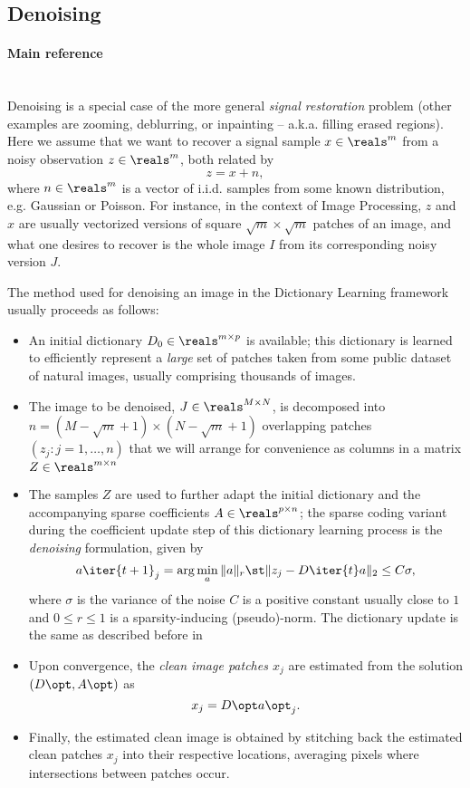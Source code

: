 \documentclass[a4paper]{IEEEtran}
\begin{document}
\subsection{Denoising}

\paragraph{Main reference} \cite{ksvd}\\

Denoising is a special case of the more general \emph{signal restoration} problem (other examples are zooming, deblurring, or inpainting -- a.k.a. filling erased regions). Here we assume that we want to recover a signal sample $x \in \reals^{m}$ from a noisy observation $z \in \reals^{m}$, both related by
\[
z = x + n,
\]
where $n \in \reals^m$ is a vector of i.i.d. samples from some known distribution, e.g. Gaussian or Poisson. For instance, in the context of Image Processing, $z$ and $x$ are usually vectorized versions of square $\sqrt{m}\times\sqrt{m}$ patches of an image, and what one desires to recover is the whole image $I$ from its corresponding noisy version $J$.

The method used for denoising an image in the Dictionary Learning framework usually proceeds as follows:
\begin{itemize}
\item An initial dictionary $D_0 \in \reals^{m{\times}p}$ is available; this dictionary is learned to efficiently represent a \emph{large} set of patches taken from some public dataset of natural images, usually comprising thousands of images.
\item The image to be denoised, $J \in \reals^{M{\times}N}$, is decomposed into $n=(M-\sqrt{m}+1){\times}(N-\sqrt{m}+1)$ overlapping patches $(z_j : j = 1,\ldots,n)$ that we will arrange for convenience as columns in a matrix $Z \in \reals^{m{\times}n}$
\item The samples $Z$ are used to further adapt the initial dictionary and the accompanying sparse coefficients $A \in \reals^{p{\times}n}$; the sparse coding variant during the coefficient update step of this dictionary learning process is the \emph{denoising} formulation, given by
\[
a\iter{t+1}_j = \arg\min_a \|a\|_r \st \|z_j - D\iter{t}a \|_2 \leq C\sigma, 
\]
where $\sigma$ is the variance of the noise $C$ is a positive constant usually close to $1$ and $0 \leq r \leq 1$ is a sparsity-inducing (pseudo)-norm. The dictionary update is the same as described before in 
\item Upon convergence, the \emph{clean image patches $x_j$} are estimated from the solution $(D\opt,A\opt)$ as $$x_j = D\opt a\opt_j.$$
\item Finally, the estimated clean image is obtained by stitching back the estimated clean patches $x_j$ into their respective locations, averaging pixels where intersections between patches occur.
\end{itemize}
\end{document}
